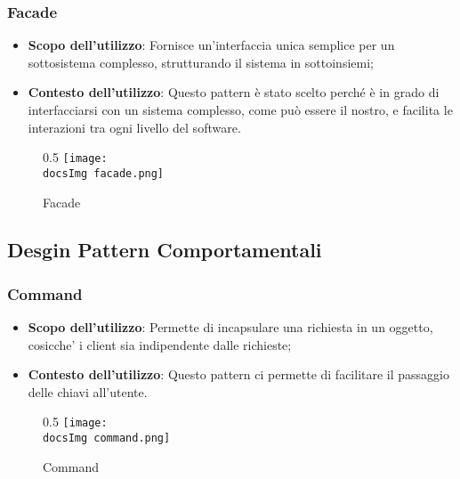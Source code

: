 		\subsubsection{Facade} 
		 \begin{itemize}
		 		\item\textbf{Scopo dell'utilizzo}: Fornisce un'interfaccia unica semplice per un sottosistema complesso, strutturando il sistema in sottoinsiemi;
		 		\item\textbf{Contesto dell'utilizzo}: Questo pattern è stato scelto perché è in grado di interfacciarsi con un sistema complesso, come può essere il nostro, e facilita le interazioni tra ogni livello del software. 
		 \end{itemize}		 	
		\begin{figure}[h]{0.5}
			\centering
			\texttt{[image: \\docsImg facade.png]}
			\caption{Facade}
			\label{fig. Facade}	
		\end{figure}
		 		
	\subsection{Desgin Pattern Comportamentali} 
		
		\subsubsection{Command}
		\begin{itemize} \itemsep1pt
			\item \textbf{Scopo dell'utilizzo}: Permette di incapsulare una richiesta in un oggetto, cosicche' i client sia indipendente dalle richieste;
			\item \textbf{Contesto dell'utilizzo}: Questo pattern ci permette di facilitare il passaggio delle chiavi all'utente.
		\end{itemize}
		\begin{figure}[h]{0.5}
			\centering
			\texttt{[image: \\docsImg command.png]}
			\caption{Command}
			\label{fig. Command}
		\end{figure}
			
		